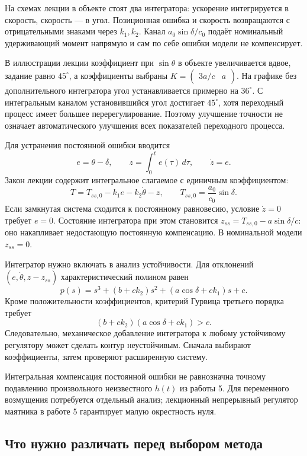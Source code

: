 На схемах лекции в объекте стоят два интегратора: ускорение интегрируется
в скорость, скорость --- в угол. Позиционная ошибка и скорость возвращаются
с отрицательными знаками через $k_1,k_2$. Канал $a_0\sin\delta/c_0$ подаёт
номинальный удерживающий момент напрямую и сам по себе ошибки модели
не компенсирует.

В иллюстрации лекции коэффициент при $\sin\theta$ в объекте увеличивается
вдвое, задание равно $45^\circ$, а коэффициенты выбраны
$K=\begin{pmatrix}3a/c&a\end{pmatrix}$.
На графике без дополнительного интегратора
угол устанавливается примерно на $36^\circ$. С интегральным каналом
установившийся угол достигает $45^\circ$, хотя переходный процесс имеет
большее перерегулирование. Поэтому улучшение точности не означает
автоматического улучшения всех показателей переходного процесса.

Для устранения постоянной ошибки вводится
\[
  e=\theta-\delta,\qquad z=\int_0^t e(\tau)\,d\tau,\qquad \dot z=e.
\]
Закон лекции содержит интегральное слагаемое с единичным коэффициентом:
\begin{equation}
  T=T_{ss,0}-k_1e-k_2\dot\theta-z,
  \qquad T_{ss,0}=\frac{a_0}{c_0}\sin\delta.
\end{equation}
Если замкнутая система сходится к постоянному равновесию, условие
$\dot z=0$ требует $e=0$. Состояние интегратора при этом становится
$z_{ss}=T_{ss,0}-a\sin\delta/c$: оно накапливает недостающую постоянную
компенсацию. В номинальной модели $z_{ss}=0$.

\addition Интегратор нужно включать в анализ устойчивости. Для отклонений
$(e,\dot\theta,z-z_{ss})$ характеристический полином равен
\[
  p(s)=s^3+(b+ck_2)s^2+(a\cos\delta+ck_1)s+c.
\]
Кроме положительности коэффициентов, критерий Гурвица третьего порядка
требует
\[
  (b+ck_2)(a\cos\delta+ck_1)>c.
\]
Следовательно, механическое добавление интегратора к любому устойчивому
регулятору может сделать контур неустойчивым. Сначала выбирают коэффициенты,
затем проверяют расширенную систему.

Интегральная компенсация постоянной ошибки не равнозначна точному
подавлению произвольного неизвестного $h(t)$ из работы 5. Для переменного
возмущения потребуется отдельный анализ; лекционный непрерывный регулятор
маятника в работе 5 гарантирует малую окрестность нуля.

\subsection{Что нужно различать перед выбором метода}

